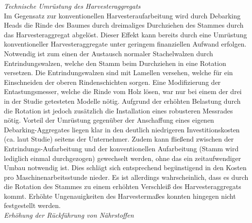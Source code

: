\documentclass[a4paper, 11pt, titlepage]{scrartcl} %
\begin{document}
\noindent \textit{Technische Umrüstung des Harvesteraggregats}\\

Im Gegensatz zur konventionellen Harvesteraufarbeitung wird durch Debarking Heads die Rinde des Baumes durch dreimaliges Durchziehen des Stammes durch das Harvesteraggregat abgelöst. Dieser Effekt kann bereits durch eine Umrüstung konventioneller Harvesteraggregate unter geringem finanziellen Aufwand erfolgen. Notwendig ist zum einen der Austausch normaler Stachelwalzen durch Entrindungswalzen, welche den Stamm beim Durchziehen in eine Rotation versetzen. Die Entrindungswalzen sind mit Lamellen versehen, welche für ein Einschneiden der oberen Rindenschichten sorgen. Eine Modifizierung der Entastungsmesser, welche die Rinde vom Holz lösen, war nur bei einem der drei in der Studie getesteten Modelle nötig. Aufgrund der erhöhten Belastung durch die Rotation ist jedoch zusätzlich die Installation eines robusteren Messrades nötig. Vorteil der Umrüstung gegenüber der Anschaffung eines eigenen Debarking-Aggregates liegen klar in den deutlich niedrigeren Investitionskosten (ca.  laut Studie) seitens der Unternehmer. Zudem kann fließend zwischen der Entrindungs-Aufarbeitung und der konventionellen Aufarbeitung (Stamm wird lediglich einmal durchgezogen) gewechselt werden, ohne das ein zeitaufwendiger Umbau notwendig ist. Dies schlägt sich entsprechend begünstigend in den Kosten pro Maschinenarbeitsstunde nieder. Es ist allerdings wahrscheinlich, dass es durch die Rotation des Stammes zu einem erhöhten Verschleiß des Harvesteraggregats kommt. Erhöhte Ungenauigkeiten des Harvestermaßes konnten hingegen nicht festgestellt werden.\\

\noindent \textit{Erhöhung der Rückführung von Nährstoffen}\\
\end{document}

